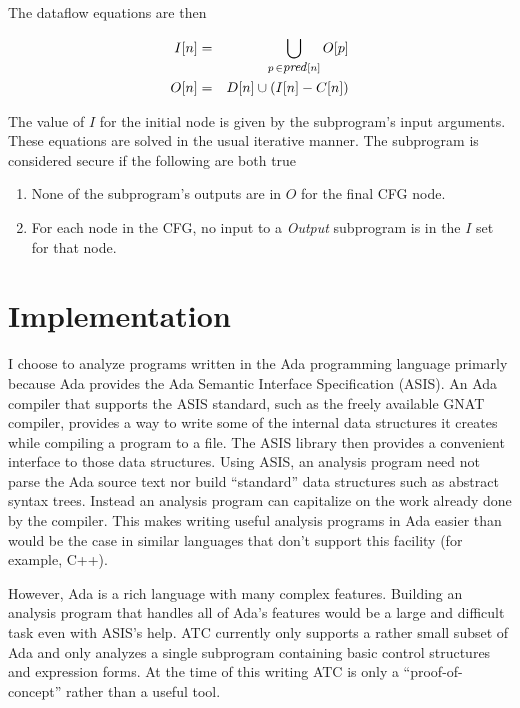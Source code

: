 \documentclass{article}
\begin{document}
The dataflow equations are then

\begin{eqnarray*}
I[n] & = & \bigcup_{p\, \in \mbox{\textit{\small pred}}[n]} O[p] \\
O[n] & = & D[n] \cup (I[n] - C[n])
\end{eqnarray*}

The value of $I$ for the initial node is given by the subprogram's input arguments. These equations are solved in the usual iterative manner. The subprogram is considered secure if the following are both true

\begin{enumerate}
\item None of the subprogram's outputs are in $O$ for the final CFG node.
\item For each node in the CFG, no input to a \textit{Output} subprogram is in the $I$ set for that node.
\end{enumerate}

\section{Implementation}

I choose to analyze programs written in the Ada programming language primarly because Ada provides the Ada Semantic Interface Specification (ASIS). An Ada compiler that supports the ASIS standard, such as the freely available GNAT compiler, provides a way to write some of the internal data structures it creates while compiling a program to a file. The ASIS library then provides a convenient interface to those data structures. Using ASIS, an analysis program need not parse the Ada source text nor build ``standard'' data structures such as abstract syntax trees. Instead an analysis program can capitalize on the work already done by the compiler. This makes writing useful analysis programs in Ada easier than would be the case in similar languages that don't support this facility (for example, C++).

However, Ada is a rich language with many complex features. Building an analysis program that handles all of Ada's features would be a large and difficult task even with ASIS's help. ATC currently only supports a rather small subset of Ada and only analyzes a single subprogram containing basic control structures and expression forms. At the time of this writing ATC is only a ``proof-of-concept'' rather than a useful tool.
\end{document}
